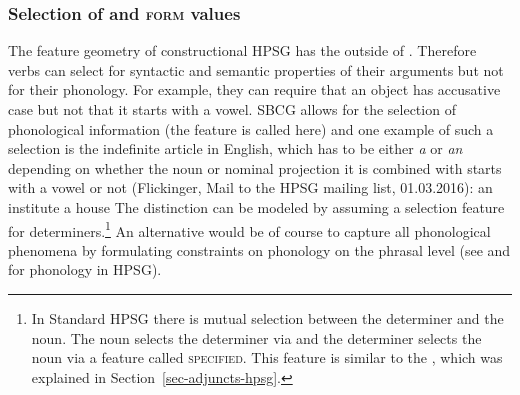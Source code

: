 

\subsubsection{Selection of \phon and \textsc{form} values}

The feature geometry of constructional HPSG has the \phonv outside of \synsem. Therefore verbs can
select for syntactic and semantic properties of their arguments but not for their phonology. For
example, they can require that an object has accusative case but not that it starts with a
vowel. SBCG allows for the selection of phonological information (the feature is called \form here)
and one example of such a selection is the indefinite article in English, which has to be either \emph{a} or
\emph{an} depending on whether the noun or nominal projection it is combined with starts with a
vowel or not (Flickinger, Mail to the HPSG mailing list, 01.03.2016):
\eal
\ex an institute
\ex a  house
\zl
\addlines
The distinction can be modeled by assuming a selection feature for determiners.\footnote{
  In Standard HPSG there is mutual selection between the determiner and the noun. The noun selects
  the determiner via \spr and the determiner selects the noun via a feature called
  \textsc{specified}. This feature is similar to the \modf, which was explained in Section~\ref{sec-adjuncts-hpsg}.
} An alternative would be of course to capture all phonological phenomena by formulating constraints on phonology on the
phrasal level (see \citealp{BK94b} and \citealp{Walther99a-u} for phonology in HPSG).

